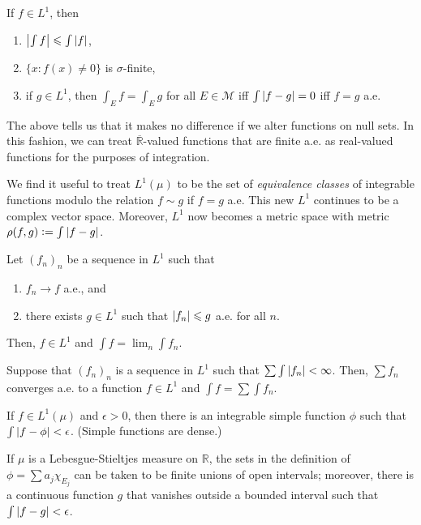 \documentclass[12pt]{article}	%
\begin{document}
\begin{prop}
	If $f \in L^{1}$, then 
	\begin{enumerate}
	\item ${\left\lvert \int f \right\lvert} \leqslant \int {\left\lvert f \right\lvert}$,
	\item $\{x : f(x) \neq 0\}$ is $\sigma$-finite,
	\item if $g \in L^{1}$, then $\int_{E} f = \int_{E} g$ for all $E \in \mathcal{M}$ iff $\int {\left\lvert f - g \right\lvert} = 0$ iff $f = g$ a.e.
	\end{enumerate} 
\end{prop}

The above tells us that it makes no difference if we alter functions on null sets. In this fashion, we can treat $\overline{\mathbb{R}}$-valued functions that are finite a.e. as real-valued functions for the purposes of integration.

We find it useful to treat $L^{1}(\mu)$ to be the set of \emph{equivalence classes} of integrable functions modulo the relation $f \sim g$ if $f = g$ a.e. This new $L^{1}$ continues to be a complex vector space. Moreover, $L^{1}$ now becomes a metric space with metric $\rho(f, g) \vcentcolon= \int {\left\lvert f - g \right\lvert}$.

\begin{thm}
	Let $(f_{n})_{n}$ be a sequence in $L^{1}$ such that
	\begin{enumerate}
		\item $f_{n} \to f$ a.e., and
		\item there exists $g \in L^{1}$ such that ${\left\lvert f_{n} \right\lvert} \leqslant g$ a.e. for all $n$.
	\end{enumerate}
	Then, $f \in L^{1}$ and $\int f = \lim_{n} \int f_{n}$.
\end{thm}
\begin{cor}
	Suppose that $(f_{n})_{n}$ is a sequence in $L^{1}$ such that $\sum \int {\left\lvert f_{n} \right\lvert} < \infty$. Then, $\sum f_{n}$ converges a.e. to a function $f \in L^{1}$ and $\int f = \sum \int f_{n}$.
\end{cor}

\begin{thm}
	If $f \in L^{1}(\mu)$ and $\epsilon > 0$, then there is an integrable simple function $\phi$ such that $\int {\left\lvert f - \phi \right\lvert} < \epsilon$. (Simple functions are dense.)

	If $\mu$ is a Lebesgue-Stieltjes measure on $\mathbb{R}$, the sets in the definition of $\phi = \sum a_{j} \chi_{E_{j}}$ can be taken to be finite unions of open intervals; moreover, there is a continuous function $g$ that vanishes outside a bounded interval such that $\int {\left\lvert f - g \right\lvert} < \epsilon$.
\end{thm}
\end{document}

